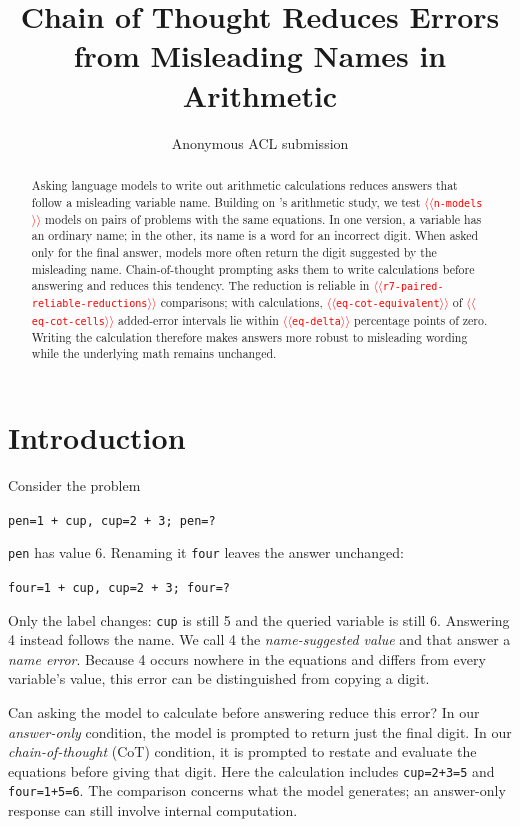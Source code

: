 \documentclass[11pt]{article}
\title{Chain of Thought Reduces Errors from Misleading Names in Arithmetic}
\author{Anonymous ACL submission}
\providecommand{\NUM}[1]{\textcolor{red}{$\langle\langle$\texttt{#1}$\rangle\rangle$}}
\begin{document}
\maketitle

\begin{abstract}
Asking language models to write out arithmetic calculations reduces answers that follow
a misleading variable name. Building on \citeauthor{kudo2026faithful}'s arithmetic study,
we test \NUM{n-models} models on pairs of problems with the same equations. In one version,
a variable has an ordinary name; in the other, its name is a word for an incorrect digit.
When asked only for the final answer, models more often return the digit suggested by
the misleading name. Chain-of-thought prompting asks them to write calculations before
answering and reduces this tendency. The reduction is reliable in
\NUM{r7-paired-reliable-reductions} comparisons; with calculations, \NUM{eq-cot-equivalent} of
\NUM{eq-cot-cells} added-error intervals lie within \NUM{eq-delta} percentage points of zero. Writing the calculation
therefore makes answers more robust to misleading wording while the underlying math
remains unchanged.
\end{abstract}

\section{Introduction}

Consider the problem
\begin{center}
\texttt{pen=1 + cup, \quad cup=2 + 3; \quad pen=?}
\end{center}
\texttt{pen} has value 6. Renaming it \texttt{four} leaves the answer unchanged:
\begin{center}
\texttt{\textcolor{inc}{four}=1 + cup, \quad cup=2 + 3; \quad \textcolor{inc}{four}=?}
\end{center}
Only the label changes: \texttt{cup} is still 5 and the queried variable is still 6.
Answering 4 instead follows the name. We call 4 the \emph{name-suggested value} and that
answer a \emph{name error}. Because 4 occurs nowhere in the equations and differs from
every variable's value, this error can be distinguished from copying a digit.

Can asking the model to calculate before answering reduce this error? In our
\emph{answer-only} condition, the model is prompted to return just the final digit.
In our \emph{chain-of-thought} (CoT) condition, it is prompted to restate and evaluate
the equations before giving that digit. Here the calculation includes
\texttt{cup=2+3=5} and \texttt{four=1+5=6}. The comparison concerns what the model
generates; an answer-only response can still involve internal computation.
\end{document}
